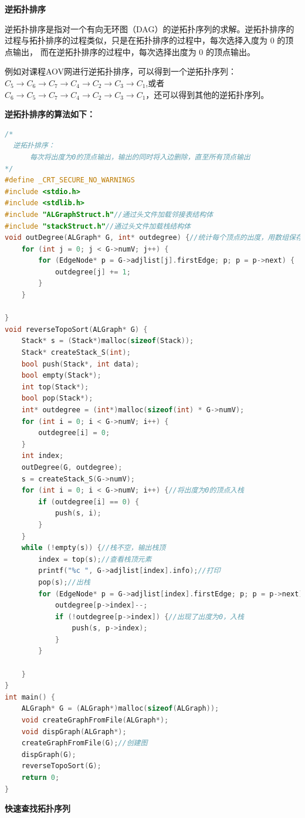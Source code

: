 \documentclass[lang=cn,newtx,10pt,scheme=chinese]{../elegantbook}
\begin{document}
\textbf{逆拓扑排序}

逆拓扑排序是指对一个有向无环图（DAG）的逆拓扑序列的求解。逆拓扑排序的过程与拓扑排序的过程类似，只是在拓扑排序的过程中，每次选择入度为 $0$ 的顶点输出，
而在逆拓扑排序的过程中，每次选择出度为 $0$ 的顶点输出。

例如对课程AOV网进行逆拓扑排序，可以得到一个逆拓扑序列：$C_5 \to C_6 \to C_7 \to C_4 \to C_2 \to C_3 \to C_1$,或者
 $C_6 \to C_5 \to C_7 \to C_4 \to C_2 \to C_3 \to C_1$，还可以得到其他的逆拓扑序列。

\textbf{逆拓扑排序的算法如下：}

\begin{lstlisting}[language=C++, caption={逆拓扑排序算法}]
  /*
  逆拓扑排序：
      每次将出度为0的顶点输出，输出的同时将入边删除，直至所有顶点输出
*/
#define _CRT_SECURE_NO_WARNINGS
#include <stdio.h>
#include <stdlib.h>
#include "ALGraphStruct.h"//通过头文件加载邻接表结构体
#include "stackStruct.h"//通过头文件加载栈结构体
void outDegree(ALGraph* G, int* outdegree) {//统计每个顶点的出度，用数组保存
    for (int j = 0; j < G->numV; j++) {
        for (EdgeNode* p = G->adjlist[j].firstEdge; p; p = p->next) {
            outdegree[j] += 1;
        }
    }

}
void reverseTopoSort(ALGraph* G) {
    Stack* s = (Stack*)malloc(sizeof(Stack));
    Stack* createStack_S(int);
    bool push(Stack*, int data);
    bool empty(Stack*);
    int top(Stack*);
    bool pop(Stack*);
    int* outdegree = (int*)malloc(sizeof(int) * G->numV);
    for (int i = 0; i < G->numV; i++) {
        outdegree[i] = 0;
    }
    int index;
    outDegree(G, outdegree);
    s = createStack_S(G->numV);
    for (int i = 0; i < G->numV; i++) {//将出度为0的顶点入栈
        if (outdegree[i] == 0) {
            push(s, i);
        }
    }
    while (!empty(s)) {//栈不空，输出栈顶
        index = top(s);//查看栈顶元素
        printf("%c ", G->adjlist[index].info);//打印
        pop(s);//出栈
        for (EdgeNode* p = G->adjlist[index].firstEdge; p; p = p->next) {//将当前出栈的顶点所指向的顶点的出度均-1
            outdegree[p->index]--;
            if (!outdegree[p->index]) {//出现了出度为0，入栈
                push(s, p->index);
            }
        }

    }
}
int main() {
    ALGraph* G = (ALGraph*)malloc(sizeof(ALGraph));
    void createGraphFromFile(ALGraph*);
    void dispGraph(ALGraph*);
    createGraphFromFile(G);//创建图
    dispGraph(G);
    reverseTopoSort(G);
    return 0;
}
\end{lstlisting}
\textbf{快速查找拓扑序列}
\end{document}
